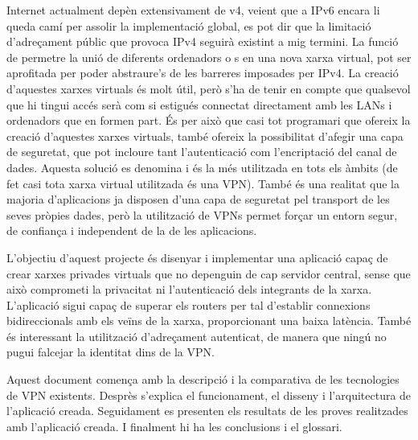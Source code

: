 Internet actualment depèn extensivament de v4, veient que a IPv6 encara li queda camí per assolir la implementació global, es pot dir que la limitació d'adreçament públic que provoca IPv4 seguirà existint a mig termini. La funció de permetre la unió de diferents ordenadors o s en una nova xarxa virtual, pot ser aprofitada per poder abstraure's de les barreres imposades per IPv4. La creació d'aquestes xarxes virtuals és molt útil, però s'ha de tenir en compte que qualsevol que hi tingui accés serà com si estigués connectat directament amb les LANs i ordenadors que en formen part. És per això que casi tot programari que ofereix la creació d'aquestes xarxes virtuals, també ofereix la possibilitat d'afegir una capa de seguretat, que pot incloure tant l'autenticació com l'encriptació del canal de dades. Aquesta solució es denomina  i és la més utilitzada en tots els àmbits (de fet casi tota xarxa virtual utilitzada és una VPN).
També és una realitat que la majoria d'aplicacions ja disposen d'una capa de seguretat pel transport de les seves pròpies dades, però la utilització de VPNs permet forçar un entorn segur, de confiança i independent de la de les aplicacions. 

L'objectiu d'aquest projecte és disenyar i implementar una aplicació capaç de crear xarxes privades virtuals que no depenguin de cap servidor central, sense que això comprometi la privacitat ni l'autenticació dels integrants de la xarxa. L'aplicació sigui capaç de superar els routers  per tal d'establir connexions bidireccionals amb els veïns de la xarxa, proporcionant una baixa latència. També és interessant la utilització d'adreçament autenticat, de manera que ningú no pugui falcejar la identitat dins de la VPN.

Aquest document comença amb la descripció i la comparativa de les tecnologies de VPN existents.
Desprès s'explica el funcionament, el disseny i l'arquitectura de l'aplicació creada.
Seguidament es presenten els resultats de les proves realitzades amb l'aplicació creada. 
I finalment hi ha les conclusions i el glossari.
